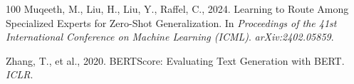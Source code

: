 \documentclass[a4paper,fleql]{cas-sc}
\begin{document}
\begin{thebibliography}{100}
Muqeeth, M., Liu, H., Liu, Y., Raffel, C., 2024.
\newblock Learning to Route Among Specialized Experts for Zero-Shot Generalization.
\newblock In \textit{Proceedings of the 41st International Conference on Machine Learning (ICML)}.
\newblock \textit{arXiv:2402.05859}.

Zhang, T., et al., 2020. BERTScore: Evaluating Text Generation with BERT. \textit{ICLR}.

\end{thebibliography}
\end{document}
